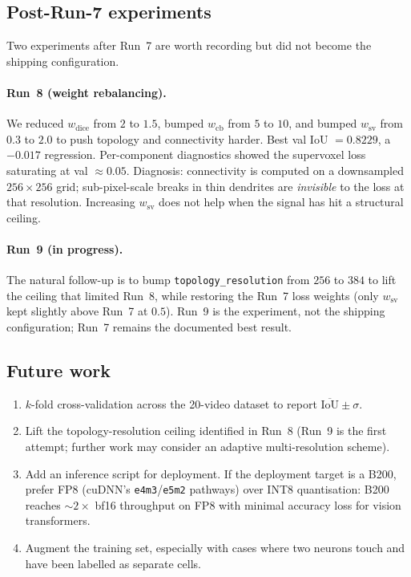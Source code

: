 \documentclass[11pt,a4paper]{article}
\begin{document}
\subsection{Post-Run-7 experiments}

Two experiments after Run~7 are worth recording but did not become
the shipping configuration.

\paragraph{Run~8 (weight rebalancing).} We reduced $w_\text{dice}$
from $2$ to $1.5$, bumped $w_\text{cb}$ from $5$ to $10$, and bumped
$w_\text{sv}$ from $0.3$ to $2.0$ to push topology and connectivity
harder. Best val IoU $= 0.8229$, a $-0.017$ regression. Per-component
diagnostics showed the supervoxel loss saturating at val
$\approx 0.05$. Diagnosis: connectivity is computed on a downsampled
$256 \times 256$ grid; sub-pixel-scale breaks in thin dendrites are
\emph{invisible} to the loss at that resolution. Increasing
$w_\text{sv}$ does not help when the signal has hit a structural
ceiling.

\paragraph{Run~9 (in progress).} The natural follow-up is to bump
\texttt{topology\_resolution} from $256$ to $384$ to lift the ceiling
that limited Run~8, while restoring the Run~7 loss weights (only
$w_\text{sv}$ kept slightly above Run~7 at $0.5$). Run~9 is the
experiment, not the shipping configuration; Run~7 remains the
documented best result.

\subsection{Future work}
\begin{enumerate}[noitemsep,topsep=3pt]
    \item $k$-fold cross-validation across the 20-video dataset to
          report $\overline{\mathrm{IoU}} \pm \sigma$.
    \item Lift the topology-resolution ceiling identified in Run~8
          (Run~9 is the first attempt; further work may consider an
          adaptive multi-resolution scheme).
    \item Add an inference script for deployment. If the deployment
          target is a B200, prefer FP8 (cuDNN's
          \texttt{e4m3}/\texttt{e5m2} pathways) over INT8 quantisation:
          B200 reaches $\sim 2\times$ bf16 throughput on FP8 with
          minimal accuracy loss for vision transformers.
    \item Augment the training set, especially with cases where two
          neurons touch and have been labelled as separate cells.
\end{enumerate}
\end{document}
